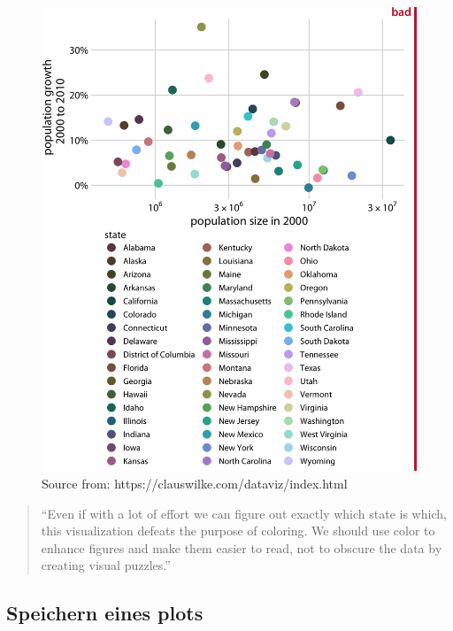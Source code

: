 \documentclass[
]{article}
\begin{document}
\begin{figure}

{\centering \includegraphics[width=16in]{images/054} 

}

\caption{Source from: https://clauswilke.com/dataviz/index.html}\label{fig:unnamed-chunk-214}
\end{figure}

\begin{quote}
``Even if with a lot of effort we can figure out exactly which state is which, this visualization defeats the purpose of coloring. We should use color to enhance figures and make them easier to read, not to obscure the data by creating visual puzzles.''
\end{quote}

\hypertarget{speichern-eines-plots}{%
\subsection{Speichern eines plots}\label{speichern-eines-plots}}
\end{document}
